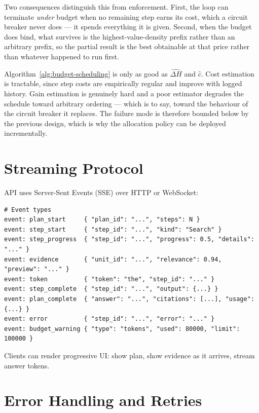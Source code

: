 Two consequences distinguish this from enforcement. First, the loop can terminate \emph{under} budget when no remaining step earns its cost, which a circuit breaker never does --- it spends everything it is given. Second, when the budget does bind, what survives is the highest-value-density prefix rather than an arbitrary prefix, so the partial result is the best obtainable at that price rather than whatever happened to run first.

\begin{observation}
\label{obs:estimator-quality}
Algorithm~\ref{alg:budget-scheduling} is only as good as $\widehat{\Delta H}$ and $\hat{c}$. Cost estimation is tractable, since step costs are empirically regular and improve with logged history. Gain estimation is genuinely hard and a poor estimator degrades the schedule toward arbitrary ordering --- which is to say, toward the behaviour of the circuit breaker it replaces. The failure mode is therefore bounded below by the previous design, which is why the allocation policy can be deployed incrementally.
\end{observation}

\section{Streaming Protocol}
\label{sec:runtime:streaming}

API uses Server-Sent Events (SSE) over HTTP or WebSocket:

\begin{verbatim}
# Event types
event: plan_start     { "plan_id": "...", "steps": N }
event: step_start     { "step_id": "...", "kind": "Search" }
event: step_progress  { "step_id": "...", "progress": 0.5, "details": "..." }
event: evidence       { "unit_id": "...", "relevance": 0.94, "preview": "..." }
event: token          { "token": "the", "step_id": "..." }
event: step_complete  { "step_id": "...", "output": {...} }
event: plan_complete  { "answer": "...", "citations": [...], "usage": {...} }
event: error          { "step_id": "...", "error": "..." }
event: budget_warning { "type": "tokens", "used": 80000, "limit": 100000 }
\end{verbatim}

Clients can render progressive UI: show plan, show evidence as it arrives, stream answer tokens.

\section{Error Handling and Retries}
\label{sec:runtime:errors}

